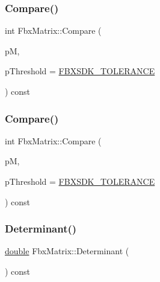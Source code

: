 \subsubsection{\texorpdfstring{Compare()}{Compare()}\hspace{0.1cm}{\footnotesize\ttfamily [1/2]}}
{\footnotesize\ttfamily int Fbx\+Matrix\+::\+Compare (\begin{DoxyParamCaption}\item[{const \hyperlink{class_fbx_matrix}{Fbx\+Matrix}}]{pM,  }\item[{const \hyperlink{class_fbx_matrix_a01f8be57393e5d9973b23897c29d5520}{double}}]{p\+Threshold = {\ttfamily \hyperlink{fbxtypes_8h_acf3cd6f208edb42ad9c9abbc1f7feea0}{F\+B\+X\+S\+D\+K\+\_\+\+T\+O\+L\+E\+R\+A\+N\+CE}} }\end{DoxyParamCaption}) const}

\mbox{\label{class_fbx_matrix_af70d97ac4256207042f4aeb933bfae99}} 
\subsubsection{\texorpdfstring{Compare()}{Compare()}\hspace{0.1cm}{\footnotesize\ttfamily [2/2]}}
{\footnotesize\ttfamily int Fbx\+Matrix\+::\+Compare (\begin{DoxyParamCaption}\item[{const \hyperlink{class_fbx_a_matrix}{Fbx\+A\+Matrix}}]{pM,  }\item[{const \hyperlink{class_fbx_matrix_a01f8be57393e5d9973b23897c29d5520}{double}}]{p\+Threshold = {\ttfamily \hyperlink{fbxtypes_8h_acf3cd6f208edb42ad9c9abbc1f7feea0}{F\+B\+X\+S\+D\+K\+\_\+\+T\+O\+L\+E\+R\+A\+N\+CE}} }\end{DoxyParamCaption}) const}

\mbox{\label{class_fbx_matrix_add2807a6e072d224b95ec69f584a3600}} 
\subsubsection{\texorpdfstring{Determinant()}{Determinant()}}
{\footnotesize\ttfamily \hyperlink{class_fbx_matrix_a01f8be57393e5d9973b23897c29d5520}{double} Fbx\+Matrix\+::\+Determinant (\begin{DoxyParamCaption}{ }\end{DoxyParamCaption}) const}

